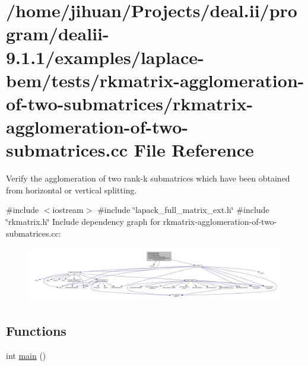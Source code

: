 \hypertarget{rkmatrix-agglomeration-of-two-submatrices_8cc}{}\section{/home/jihuan/\+Projects/deal.ii/program/dealii-\/9.1.1/examples/laplace-\/bem/tests/rkmatrix-\/agglomeration-\/of-\/two-\/submatrices/rkmatrix-\/agglomeration-\/of-\/two-\/submatrices.cc File Reference}
\label{rkmatrix-agglomeration-of-two-submatrices_8cc}


Verify the agglomeration of two rank-\/k submatrices which have been obtained from horizontal or vertical splitting.  


{\ttfamily \#include $<$iostream$>$}\newline
{\ttfamily \#include \char`\"{}lapack\+\_\+full\+\_\+matrix\+\_\+ext.\+h\char`\"{}}\newline
{\ttfamily \#include \char`\"{}rkmatrix.\+h\char`\"{}}\newline
Include dependency graph for rkmatrix-\/agglomeration-\/of-\/two-\/submatrices.cc\+:
\nopagebreak
\begin{figure}[H]
\begin{center}
\leavevmode
\includegraphics[width=350pt]{rkmatrix-agglomeration-of-two-submatrices_8cc__incl}
\end{center}
\end{figure}
\subsection*{Functions}
\begin{DoxyCompactItemize}
\item 
int \hyperlink{rkmatrix-agglomeration-of-two-submatrices_8cc_ae66f6b31b5ad750f1fe042a706a4e3d4}{main} ()
\end{DoxyCompactItemize}


